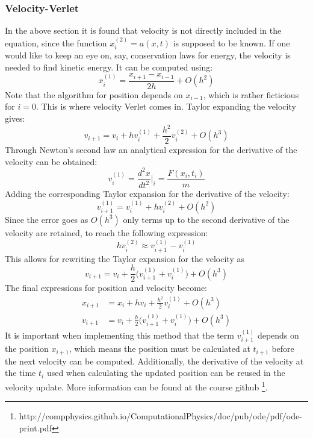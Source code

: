 \subsubsection{Velocity-Verlet}
In the above section it is found that velocity is not directly included in the equation, since
the function $x_i^{{(2)}} = a(x,t)$ is supposed to be known. If one would like to keep an eye on, say,
conservation laws for energy, the velocity is needed to find kinetic energy. It can be computed
using:
\begin{equation*}
x_i^{(1)} = \frac{x_{i+1} - x_{i-1}}{2h} + O(h^2)
\end{equation*}
Note that the algorithm for position depends on $x_{i-1}$, which is rather ficticious for $i=0$.
This is where velocity Verlet comes in.  
\newline 
Taylor expanding the velocity gives:
\begin{equation*}
v_{i+1} = v_i + hv_i^{(1)} + \frac{h^2}{2}v_i^{{(2)}} + O(h^3)
\end{equation*}
Through Newton's second law an analytical expression for the derivative of the velocity can be
obtained:
\begin{equation*}
v_i^{(1)} = \frac{d^2x}{dt^2}|_i =\frac{F(x_i,t_i)}{m}
\end{equation*}
Adding the corresponding Taylor expansion for the derivative of the velocity:
\begin{equation*}
v_{i+1}^{(1)} = v_i^{(1)} + hv_i^{{(2)}} + O(h^2)
\end{equation*}
Since the error goes as $O(h^3)$ only terms up to the second derivative of the velocity are retained,
to reach the following expression:
\begin{equation*}
hv_i^{{(2)}} \approx v_{i+1}^{(1)} - v_i^{(1)}
\end{equation*}
This allows for rewriting the Taylor expansion for the velocity as
\begin{equation*}
v_{i+1} = v_i + \frac{h}{2}\big(v_{i+1}^{(1)} + v_i^{(1)}\big) + O(h^3)
\end{equation*}
The final expressions for position and velocity become:
\begin{align*}
x_{i+1} &= x_i + hv_i + \frac{h^2}{2}v_i^{(1)} + O(h^3) \\
v_{i+1} &= v_i + \frac{h}{2}\big(v_{i+1}^{(1)} + v_i^{(1)}\big) + O(h^3)
\end{align*}
It is important when implementing this method that the term $v_{i+1}^{(1)}$ depends on the position
$x_{i+1}$, which means the position must be calculated at $t_{i+1}$ before the next velocity can
be computed. Additionally, the derivative of the velocity at the time $t_i$ used when calculating
the updated position can be reused in the velocity update.
More information can be found at the course github 
\footnote{http://compphysics.github.io/ComputationalPhysics/doc/pub/ode/pdf/ode-print.pdf}.

